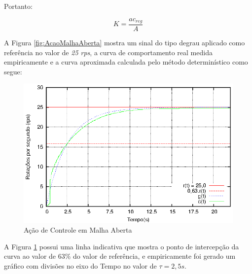 Portanto:

\begin{equation}
K = \frac{ac_{reg}}{A}
\label{eq:calcK}
\end{equation}









A Figura \ref{fig:AcaoMalhaAberta} mostra um sinal do tipo degrau aplicado como referência no valor de \emph{25 rps}, a curva de comportamento real medida empiricamente e a curva aproximada calculada pelo método determinístico como segue:

\begin{figure}[!htb]
\center\includegraphics[scale=1.4]{./imagens/acaoMalhaAbertaTau.eps}
\caption{Ação de Controle em Malha Aberta}
\label{fig:acaoMalhaAberTau}
\end{figure}

A Figura \ref{fig:acaoMalhaAberTau} possui uma linha indicativa que mostra o ponto de intercepção da curva ao valor de 63\% do valor de referência, e empiricamente foi gerado um gráfico com divisões no eixo do Tempo no valor de $\tau = 2,5s $.

